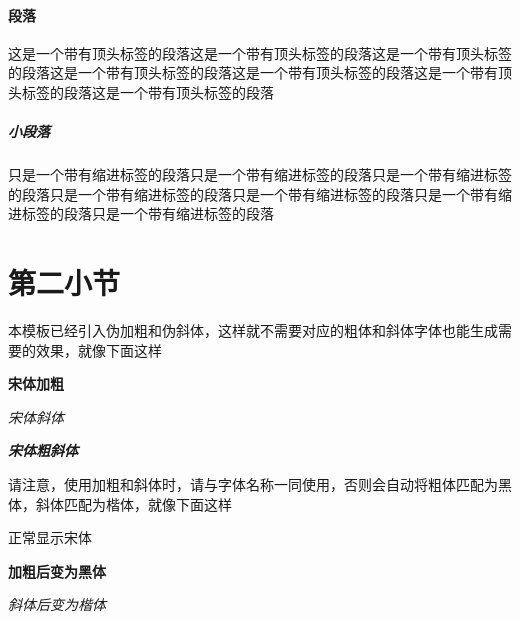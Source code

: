 \documentclass{CustGraduPaper}
\begin{document}
\paragraph{段落}\label{para:para}这是一个带有顶头标签的段落这是一个带有顶头标签的段落这是一个带有顶头标签的段落这是一个带有顶头标签的段落这是一个带有顶头标签的段落这是一个带有顶头标签的段落这是一个带有顶头标签的段落
\subparagraph{小段落}\label{subpara:subpara}只是一个带有缩进标签的段落只是一个带有缩进标签的段落只是一个带有缩进标签的段落只是一个带有缩进标签的段落只是一个带有缩进标签的段落只是一个带有缩进标签的段落只是一个带有缩进标签的段落
\section{第二小节}
本模板已经引入伪加粗和伪斜体，这样就不需要对应的粗体和斜体字体也能生成需要的效果，就像下面这样

{\songti \bfseries 宋体加粗}

{\songti \itshape 宋体斜体}

{\songti \bfseries \itshape 宋体粗斜体}

请注意，使用加粗和斜体时，请与字体名称一同使用，否则会自动将粗体匹配为黑体，斜体匹配为楷体，就像下面这样

{正常显示宋体}

{\bfseries 加粗后变为黑体}

{\itshape 斜体后变为楷体}
\end{document}
